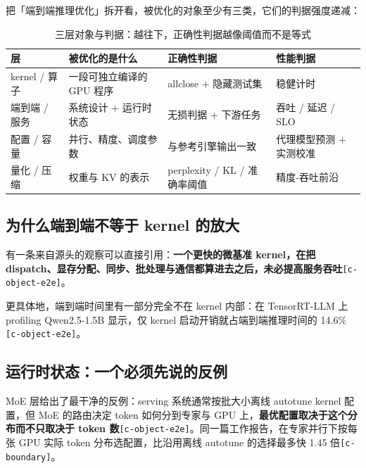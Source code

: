 把「端到端推理优化」拆开看，被优化的对象至少有三类，它们的判据强度递减：


\begin{table}[t]
\centering
\footnotesize
\setlength{\tabcolsep}{4pt}
\caption{三层对象与判据：越往下，正确性判据越像阈值而不是等式}
\label{tab:1}
\begin{tabular}{llll}
\toprule
层 & 被优化的是什么 & 正确性判据 & 性能判据 \\
\midrule
kernel / 算子 & 一段可独立编译的 GPU 程序 & allclose + 隐藏测试集 & 稳健计时 \\
端到端 / 服务 & 系统设计 + 运行时状态 & 无损判据 + 下游任务 & 吞吐 / 延迟 / SLO \\
配置 / 容量 & 并行、精度、调度参数 & 与参考引擎输出一致 & 代理模型预测 + 实测校准 \\
量化 / 压缩 & 权重与 KV 的表示 & perplexity / KL / 准确率阈值 & 精度-吞吐前沿 \\
\bottomrule
\end{tabular}
\end{table}

\subsection{为什么端到端不等于 kernel 的放大}

有一条来自源头的观察可以直接引用：\textbf{一个更快的微基准 kernel，在把 dispatch、显存分配、同步、批处理与通信都算进去之后，未必提高服务吞吐}{\scriptsize\texttt{[c-\hspace{0pt}object-\hspace{0pt}e2e]}}。


更具体地，端到端时间里有一部分完全不在 kernel 内部：在 TensorRT-LLM 上 profiling Qwen2.5-1.5B 显示，仅 kernel 启动开销就占端到端推理时间的 14.6\%{\scriptsize\texttt{[c-\hspace{0pt}object-\hspace{0pt}e2e]}}。


\subsection{运行时状态：一个必须先说的反例}

MoE 层给出了最干净的反例：serving 系统通常按批大小离线 autotune kernel 配置，但 MoE 的路由决定 token 如何分到专家与 GPU 上，\textbf{最优配置取决于这个分布而不只取决于 token 数}{\scriptsize\texttt{[c-\hspace{0pt}object-\hspace{0pt}e2e]}}。同一篇工作报告，在专家并行下按每张 GPU 实际 token 分布选配置，比沿用离线 autotune 的选择最多快 1.45 倍{\scriptsize\texttt{[c-\hspace{0pt}boundary]}}。


